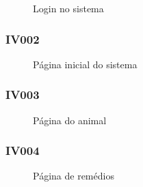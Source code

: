 \documentclass[12pt]{article}
\begin{document}
\begin{figure}[!h]
	\begin{center}
		\caption{Login no sistema}


	\end{center}
\end{figure}


\subsubsection{IV002}

\begin{figure}[!h]
	\begin{center}
		\caption{Página inicial do sistema}


	\end{center}
\end{figure}

\newpage

\subsubsection{IV003}

\begin{figure}[!h]
	\begin{center}
		\caption{Página do animal}


	\end{center}
\end{figure}


\subsubsection{IV004}

\begin{figure}[!h]
	\begin{center}
		\caption{Página de remédios}


	\end{center}
\end{figure}

\newpage
\end{document}
